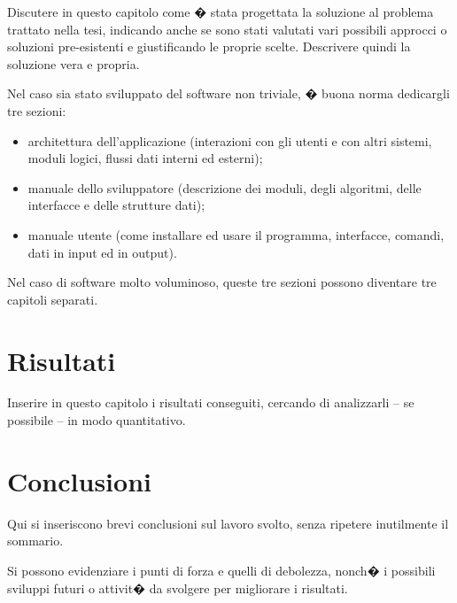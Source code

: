 \documentclass[
    pdfa,       %
    cucitura,   %
]{toptesi}
\begin{document}
Discutere in questo capitolo come � stata progettata la soluzione al problema trattato nella tesi, indicando anche se sono stati valutati vari possibili approcci o soluzioni pre-esistenti e giustificando le proprie scelte. Descrivere quindi la soluzione vera e propria.

Nel caso sia stato sviluppato del software non triviale, � buona norma dedicargli tre sezioni:
\begin{itemize}
\item architettura dell'applicazione (interazioni con gli utenti e con altri sistemi, moduli logici, flussi dati interni ed esterni);
\item manuale dello sviluppatore (descrizione dei moduli, degli algoritmi, delle interfacce e delle strutture dati);
\item manuale utente (come installare ed usare il programma, interfacce, comandi, dati in input ed in output).
\end{itemize}
Nel caso di software molto voluminoso, queste tre sezioni possono diventare tre capitoli separati.

\chapter{Risultati}

Inserire in questo capitolo i risultati conseguiti, cercando di analizzarli -- se possibile -- in modo quantitativo.


\chapter{Conclusioni}

Qui si inseriscono brevi conclusioni sul lavoro svolto, senza ripetere inutilmente il sommario.

Si possono evidenziare i punti di forza e quelli di debolezza, nonch� i possibili sviluppi futuri o attivit� da svolgere per migliorare i risultati.

\fi
\end{document}
